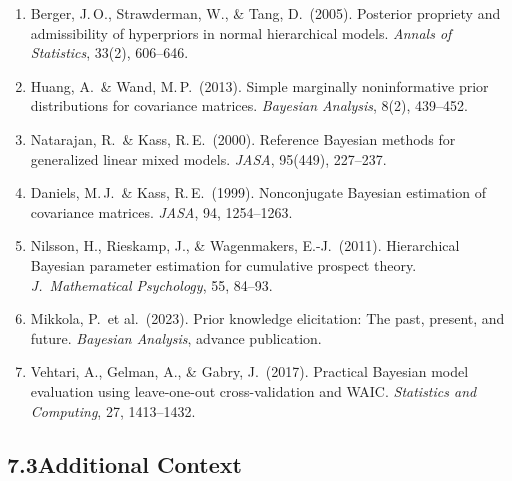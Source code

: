 \documentclass[12pt,a4paper]{article}
\begin{document}
\begin{enumerate}[leftmargin=1.5em]
\item[6.] Berger, J.\,O., Strawderman, W., \& Tang, D.\ (2005).  Posterior
propriety and admissibility of hyperpriors in normal hierarchical models.
\textit{Annals of Statistics}, 33(2), 606--646.

\item[7.] Huang, A.\ \& Wand, M.\,P.\ (2013).  Simple marginally
noninformative prior distributions for covariance matrices.  \textit{Bayesian
Analysis}, 8(2), 439--452.

\item[8.] Natarajan, R.\ \& Kass, R.\,E.\ (2000).  Reference Bayesian methods
for generalized linear mixed models.  \textit{JASA}, 95(449), 227--237.

\item[9.] Daniels, M.\,J.\ \& Kass, R.\,E.\ (1999).  Nonconjugate Bayesian
estimation of covariance matrices.  \textit{JASA}, 94, 1254--1263.

\item[10.] Nilsson, H., Rieskamp, J., \& Wagenmakers, E.-J.\ (2011).
Hierarchical Bayesian parameter estimation for cumulative prospect theory.
\textit{J.\ Mathematical Psychology}, 55, 84--93.

\item[11.] Mikkola, P.\ et al.\ (2023).  Prior knowledge elicitation: The past,
present, and future.  \textit{Bayesian Analysis}, advance publication.

\item[12.] Vehtari, A., Gelman, A., \& Gabry, J.\ (2017).  Practical Bayesian
model evaluation using leave-one-out cross-validation and WAIC.
\textit{Statistics and Computing}, 27, 1413--1432.
\end{enumerate}

\subsection{7.3\quad Additional Context}
\end{document}
